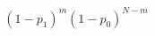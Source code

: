   \begin{equation}
    \left(1-p_1\right)^m\left(1-p_0\right)^{N-m}
    \label{eq:noErrProb}
  \end{equation}
